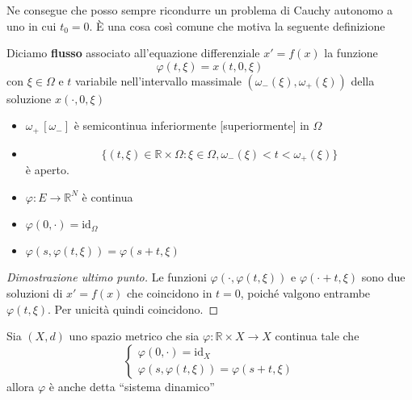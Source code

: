Ne consegue che posso sempre ricondurre un problema di Cauchy autonomo a uno in
cui \(t_{0} = 0\). È una cosa così comune che motiva la seguente definizione

\begin{definition}
    Diciamo \textbf{flusso} associato all'equazione differenziale \(x' = f
    {(x)}\) la funzione
    \[
        \varphi {(t, \xi)} = x{(t , 0, \xi)}
    \]
    con \(\xi \in \Omega\) e \( t\) variabile nell'intervallo massimale
    \({(\omega_-{(\xi)}, \omega_+{(\xi)})}\) della soluzione \(x{(\cdot , 0, \xi)}\) 
\end{definition}

\begin{proposition}
    \begin{itemize}
    \item \(\omega_+\, [\omega_-]\) è semicontinua inferiormente [superiormente] in
    \(\Omega\)
\item \[
        \{{(t, \xi)} \in \mathbb{R} \times \Omega : \xi \in \Omega,
        \omega_-{(\xi)} < t < \omega_+{(\xi)}\} 
    \]
    è aperto.

\item \(\varphi : E \to \mathbb{R}^{N}\) è continua

\item \(\varphi {(0, \cdot )} = \text{id}_\Omega\) 

\item \(\varphi {(s, \varphi {(t, \xi)})} = \varphi {(s+t, \xi)}\) 
    \end{itemize}
\end{proposition}
    
\begin{proof}[Dimostrazione ultimo punto]
    Le funzioni \(\varphi {(\cdot , \varphi {(t, \xi)})}\)  e \(\varphi {(\cdot
    +t, \xi)}\) sono due soluzioni di \(x'=f{(x)}\) che coincidono in \(t = 0\),
    poiché valgono entrambe \(\varphi {(t, \xi)}\). Per unicità quindi
    coincidono.
\end{proof}

\begin{remark}
    Sia \({(X, d)}\) uno spazio metrico che sia \(\varphi : \mathbb{R} \times X
    \to X\) continua tale che
    \[
        \begin{cases}
            \varphi {(0, \cdot )} = \text{id}_X \\
            \varphi {(s, \varphi {(t, \xi)})} = \varphi {(s+t, \xi)}
        \end{cases}
    \]
    allora \(\varphi \) è anche detta ``sistema dinamico''
\end{remark}

